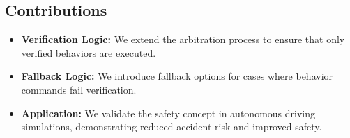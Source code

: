 \subsection{Contributions}

\begin{itemize}
\item \textbf{Verification Logic:} We extend the arbitration process to ensure that only verified behaviors are executed.
\item \textbf{Fallback Logic:} We introduce fallback options for cases where behavior commands fail verification.
\item \textbf{Application:} We validate the safety concept in autonomous driving simulations, demonstrating reduced accident risk and improved safety.
\end{itemize}
